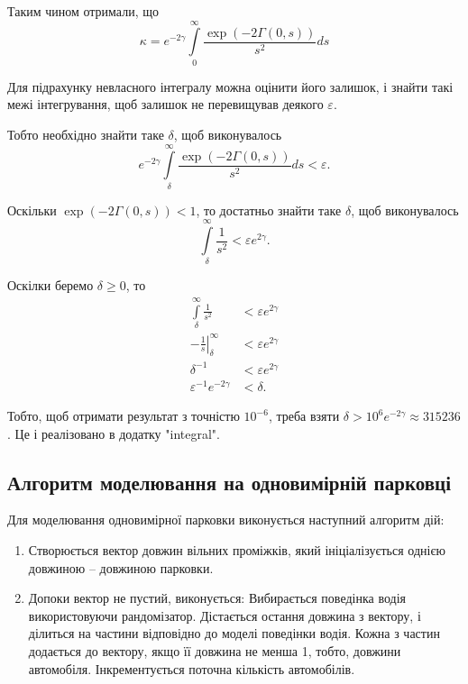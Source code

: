 Таким чином отримали, що
\begin{equation}
\kappa = e^{-2\gamma} \int\limits_0^\infty \frac{\exp(-2\Gamma(0,s))}{s^2} ds
\end{equation}

Для підрахунку невласного інтегралу можна оцінити його залишок, і знайти такі межі інтегрування, щоб залишок не перевищував деякого $\varepsilon$.

Тобто необхідно знайти таке $\delta$, щоб виконувалось
$$
	e^{-2\gamma} \int\limits_\delta^\infty \frac{\exp(-2\Gamma(0,s))}{s^2} ds < \varepsilon.
$$

Оскільки $\exp(-2\Gamma(0,s)) < 1$, то достатньо знайти таке $\delta$, щоб виконувалось
$$
	\int\limits_\delta^\infty \frac{1}{s^2} < \varepsilon e^{2\gamma}.
$$

Оскілки беремо $\delta \geq 0$, то
\begin{align*}
	\int\limits_\delta^\infty \frac{1}{s^2} &< \varepsilon e^{2\gamma}\\
	-\left. \frac{1}{s} \right|_\delta^\infty &< \varepsilon e^{2\gamma} \\
	\delta^{-1} &< \varepsilon e^{2\gamma}  \\
	\varepsilon^{-1} e^{-2\gamma} &< \delta.
\end{align*}

Тобто, щоб отримати результат з точністю $10^{-6}$, треба взяти  $\delta > 10^6 e^{-2\gamma} \approx 315236$. Це і реалізовано в додатку "integral".

\subsection{Алгоритм моделювання на одновимірній парковці}

Для моделювання одновимірної парковки виконується наступний алгоритм дій:
\begin{enumerate}
\item Створюється вектор довжин вільних проміжків, який ініціалізується однією довжиною – довжиною парковки. 
\item Допоки вектор не пустий, виконується: 
\subitem Вибирається поведінка водія використовуючи рандомізатор.
\subitem Дістається остання довжина з вектору, і ділиться на частини відповідно до моделі поведінки водія.
\subitem Кожна з частин додається до вектору, якщо її довжина не менша 1, тобто, довжини автомобіля.
\subitem Інкрементується поточна кількість автомобілів.
\end{enumerate}


